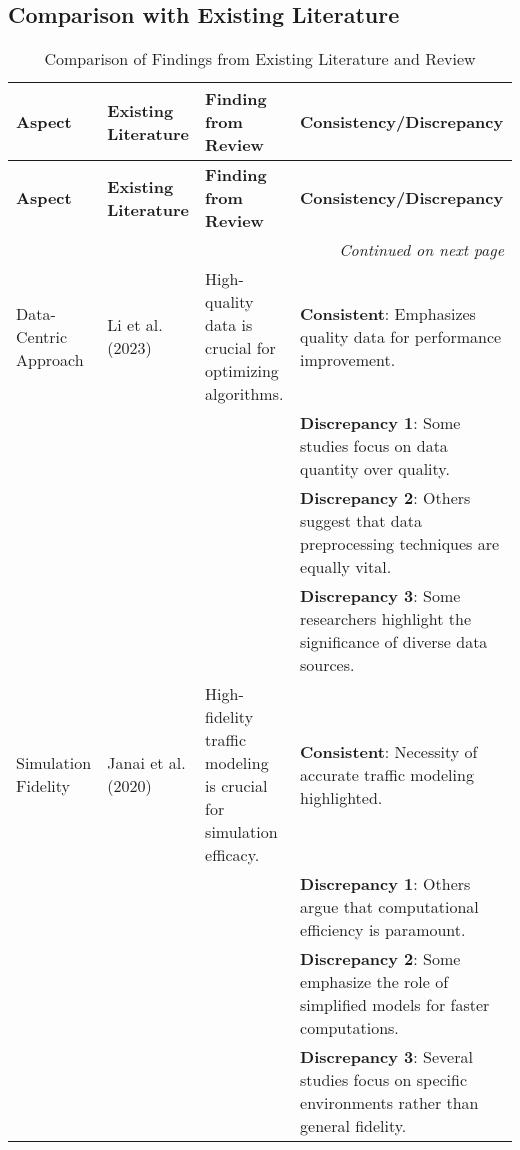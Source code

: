\documentclass[lettersize,journal]{IEEEtran}
\begin{document}
\cleardoublepage
\sloppy %
\onecolumn
\subsection{Comparison with Existing Literature}

\begin{longtable}[htbp]{|l|p{3cm}|p{3cm}|p{6.5cm}|} %
    \caption{Comparison of Findings from Existing Literature and Review} \label{tab:comparison} \\

    \hline
    \textbf{Aspect} & \textbf{Existing Literature} & \textbf{Finding from Review} & \textbf{Consistency/Discrepancy} \\ \hline
    \endfirsthead

    \hline
    \textbf{Aspect} & \textbf{Existing Literature} & \textbf{Finding from Review} & \textbf{Consistency/Discrepancy} \\ \hline
    \endhead

    \hline
    \multicolumn{4}{r}{\textit{Continued on next page}} \\ \hline
    \endfoot

    \hline
    \endlastfoot

    Data-Centric Approach & Li et al. (2023) & High-quality data is crucial for optimizing algorithms. & \textbf{Consistent}: Emphasizes quality data for performance improvement. \\
    & & & \textbf{Discrepancy 1}: Some studies focus on data quantity over quality. \\
    & & & \textbf{Discrepancy 2}: Others suggest that data preprocessing techniques are equally vital. \\
    & & & \textbf{Discrepancy 3}: Some researchers highlight the significance of diverse data sources. \\ \hline

    Simulation Fidelity & Janai et al. (2020) & High-fidelity traffic modeling is crucial for simulation efficacy. & \textbf{Consistent}: Necessity of accurate traffic modeling highlighted. \\
    & & & \textbf{Discrepancy 1}: Others argue that computational efficiency is paramount. \\
    & & & \textbf{Discrepancy 2}: Some emphasize the role of simplified models for faster computations. \\
    & & & \textbf{Discrepancy 3}: Several studies focus on specific environments rather than general fidelity. \\ \hline


\end{longtable}
\end{document}
